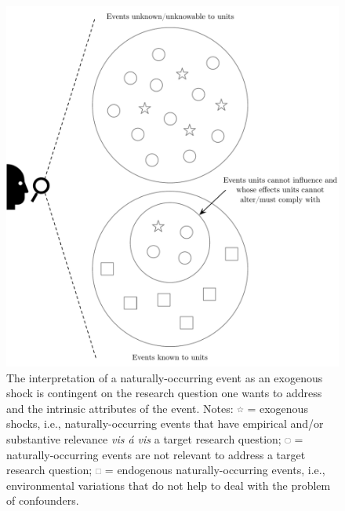 \begin{refsection}
\begin{figure}[!htbp]
  \centering
  \includegraphics[width=1\textwidth]{exhibits/exogenous_shocks_and_ne.pdf}
  \caption{The interpretation of a naturally-occurring event as an exogenous 
  shock is contingent on the research question one wants to address and the 
  intrinsic attributes of the event. 
  Notes:  
  \includegraphics[width=0.02\textwidth]{exhibits/exogenous_shocks_and_ne_0.pdf}
  = exogenous shocks, i.e., naturally-occurring events that have empirical and/or 
  substantive relevance \textit{vis \'{a} vis} a target research question;
  \includegraphics[width=0.0175\textwidth]{exhibits/exogenous_shocks_and_ne_2.pdf}
  = naturally-occurring events are not relevant to address a target research 
  question;
  \includegraphics[width=0.0175\textwidth]{exhibits/exogenous_shocks_and_ne_1.pdf}
  = endogenous naturally-occurring events, i.e., environmental variations that 
  do not help to deal with the problem of confounders.}
  \label{fig:exogeneous_shocks_and_ne}
\end{figure}


\end{refsection}
